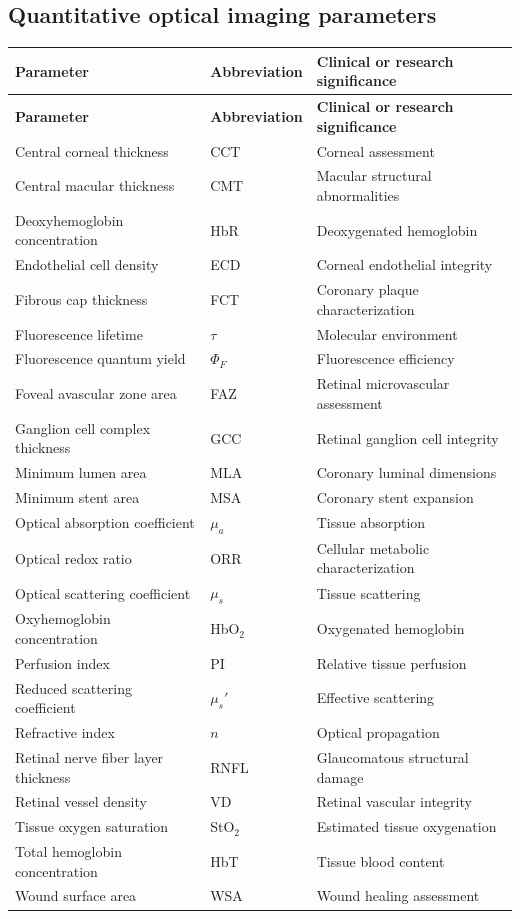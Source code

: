 \subsection{Quantitative optical imaging parameters}
\begin{longtable}{@{}p{}p{}p{}@{}}
\toprule
\textbf{Parameter} & \textbf{Abbreviation} & \textbf{Clinical or research significance} \\
\midrule
\endfirsthead
\toprule
\textbf{Parameter} & \textbf{Abbreviation} & \textbf{Clinical or research significance} \\
\midrule
\endhead
Central corneal thickness & CCT & Corneal assessment \\
Central macular thickness & CMT & Macular structural abnormalities \\
Deoxyhemoglobin concentration & HbR & Deoxygenated hemoglobin \\
Endothelial cell density & ECD & Corneal endothelial integrity \\
Fibrous cap thickness & FCT & Coronary plaque characterization \\
Fluorescence lifetime & $\tau$ & Molecular environment \\
Fluorescence quantum yield & $\Phi_F$ & Fluorescence efficiency \\
Foveal avascular zone area & FAZ & Retinal microvascular assessment \\
Ganglion cell complex thickness & GCC & Retinal ganglion cell integrity \\
Minimum lumen area & MLA & Coronary luminal dimensions \\
Minimum stent area & MSA & Coronary stent expansion \\
Optical absorption coefficient & $\mu_a$ & Tissue absorption \\
Optical redox ratio & ORR & Cellular metabolic characterization \\
Optical scattering coefficient & $\mu_s$ & Tissue scattering \\
Oxyhemoglobin concentration & HbO$_2$ & Oxygenated hemoglobin \\
Perfusion index & PI & Relative tissue perfusion \\
Reduced scattering coefficient & $\mu_s'$ & Effective scattering \\
Refractive index & $n$ & Optical propagation \\
Retinal nerve fiber layer thickness & RNFL & Glaucomatous structural damage \\
Retinal vessel density & VD & Retinal vascular integrity \\
Tissue oxygen saturation & StO$_2$ & Estimated tissue oxygenation \\
Total hemoglobin concentration & HbT & Tissue blood content \\
Wound surface area & WSA & Wound healing assessment \\
\bottomrule
\end{longtable}


